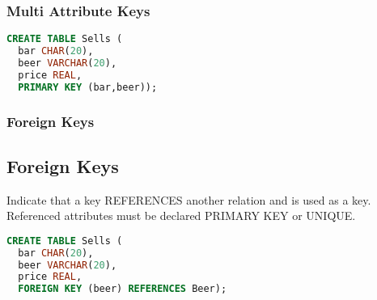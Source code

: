 \documentclass[12pt]{article}
\begin{document}
\subsubsection{Multi Attribute Keys}
\begin{lstlisting}[language=sql,caption=tuple as a primary key]
  CREATE TABLE Sells (
  bar CHAR(20),
  beer VARCHAR(20),
  price REAL,
  PRIMARY KEY (bar,beer));
\end{lstlisting}

\subsubsection{Foreign Keys}
\subsection{Foreign Keys}
Indicate that a key REFERENCES another relation and is used as a key.\\
Referenced attributes must be declared PRIMARY KEY or UNIQUE.
\begin{lstlisting}[language=sql,caption=tuple as a primary key]
  CREATE TABLE Sells (
  bar CHAR(20),
  beer VARCHAR(20),
  price REAL,
  FOREIGN KEY (beer) REFERENCES Beer);
\end{lstlisting}
\end{document}
